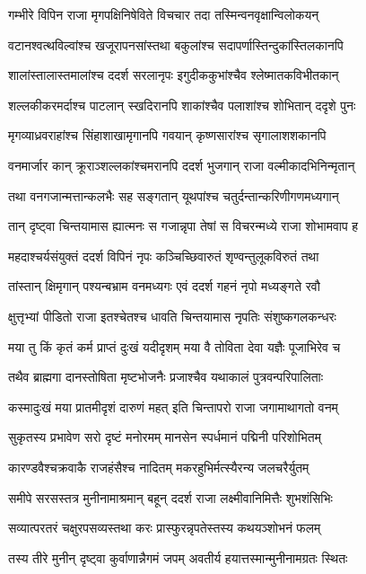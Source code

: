 \twolineshloka
{गम्भीरे विपिन राजा मृगपक्षिनिषेविते}
{विचचार तदा तस्मिन्वनवृक्षान्विलोकयन्} %

\twolineshloka
{वटानश्वत्थविल्वांश्च खजूरापनसांस्तथा}
{बकुलांश्च सदापर्णास्तिन्दुकांस्तिलकानपि} %

\twolineshloka
{शालांस्तालास्तमालांश्च ददर्श सरलानृपः}
{इगुदीककुभांश्चैव श्लेष्मातकविभीतकान्} %

\twolineshloka
{शल्लकीकरमर्दाश्च पाटलान् स्खदिरानपि}
{शाकांश्चैव पलाशांश्च शोभितान् ददृशे पुनः} %

\twolineshloka
{मृगव्याध्रवराहांश्च सिंहाशाखामृगानपि}
{गवयान् कृष्णसारांश्च सृगालाशशकानपि} %

\twolineshloka
{वनमार्जार कान् क्रूराञ्शल्लकांश्चमरानपि}
{ददर्श भुजगान् राजा वल्मीकादभिनिन्मृतान्} %

\twolineshloka
{तथा वनगजान्मत्तान्कलभैः सह सङ्गतान्}
{यूथपांश्च चतुर्दन्तान्करिणीगणमध्यगान्} %

\twolineshloka
{तान् दृष्ट्वा चिन्तयामास ह्यात्मनः स गजान्नृपा}
{तेषां स विचरन्मध्ये राजा शोभामवाप ह} %

\twolineshloka
{महदाश्चर्यसंयुक्तं ददर्श विपिनं नृपः}
{कञ्चिच्छिवारुतं शृण्वन्तुलूकविरुतं तथा} %

\twolineshloka
{तांस्तान् क्षिमृगान् पश्यन्बभ्राम वनमध्यगः}
{एवं ददर्श गहनं नृपो मध्यङ्गते रवौ} %

\twolineshloka
{क्षुत्तृभ्यां पीडितो राजा इतश्चेतश्च धावति}
{चिन्तयामास नृपतिः संशुष्कगलकन्धरः} %

\twolineshloka
{मया तु किं कृतं कर्म प्राप्तं दुःखं यदीदृशम्}
{मया वै तोविता देवा यज्ञैः पूजाभिरेव च} %

\twolineshloka
{तथैव ब्राह्मगा दानस्तोषिता मृष्टभोजनैः}
{प्रजाश्चैव यथाकालं पुत्रवन्परिपालिताः} %

\twolineshloka
{कस्मादुःखं मया प्रातमीदृशं दारुणं महत्}
{इति चिन्तापरो राजा जगामाथागतो वनम्} %

\twolineshloka
{सुकृतस्य प्रभावेण सरो दृष्टं मनोरमम्}
{मानसेन स्पर्धमानं पद्मिनी परिशोभितम्} %

\twolineshloka
{कारण्डवैश्चक्रवाकै राजहंसैश्च नादितम्}
{मकरहुभिर्मत्स्यैरन्य जलचरैर्युतम्} %

\twolineshloka
{समीपे सरसस्तत्र मुनीनामाश्रमान् बहून्}
{ददर्श राजा लक्ष्मीवानिमित्तैः शुभशंसिभिः} %

\twolineshloka
{सव्यात्परतरं चक्षुरपसव्यस्तथा करः}
{प्रास्फुरन्नृपतेस्तस्य कथयञ्शोभनं फलम्} %

\twolineshloka
{तस्य तीरे मुनीन् दृष्ट्वा कुर्वाणान्नैगमं जपम्}
{अवतीर्य हयात्तस्मान्मुनीनामग्रतः स्थितः} %

